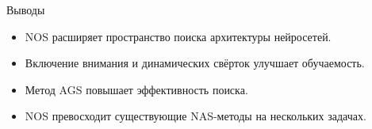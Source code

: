 \documentclass{beamer}
\begin{document}
\begin{frame}{Выводы}
    \begin{itemize}
        \item NOS расширяет пространство поиска архитектуры нейросетей.
        \item Включение внимания и динамических свёрток улучшает обучаемость.
        \item Метод AGS повышает эффективность поиска.
        \item NOS превосходит существующие NAS-методы на нескольких задачах.
    \end{itemize}
\end{frame}
\end{document}
